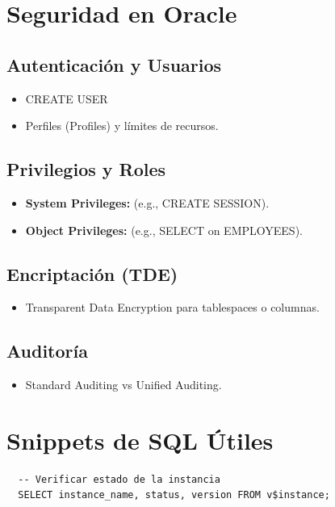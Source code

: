 \documentclass[11pt]{article}
\begin{document}
\section{Seguridad en Oracle}
\label{sec:orgdd45089}
\subsection{Autenticación y Usuarios}
\label{sec:orgaed1488}
\begin{itemize}
\item CREATE USER
\item Perfiles (Profiles) y límites de recursos.
\end{itemize}
\subsection{Privilegios y Roles}
\label{sec:orgdf0d904}
\begin{itemize}
\item \textbf{System Privileges:} (e.g., CREATE SESSION).
\item \textbf{Object Privileges:} (e.g., SELECT on EMPLOYEES).
\end{itemize}
\subsection{Encriptación (TDE)}
\label{sec:org36f106d}
\begin{itemize}
\item Transparent Data Encryption para tablespaces o columnas.
\end{itemize}
\subsection{Auditoría}
\label{sec:org42d23c1}
\begin{itemize}
\item Standard Auditing vs Unified Auditing.
\end{itemize}
\section{Snippets de SQL Útiles}
\label{sec:org5b2d61a}
\begin{verbatim}
  -- Verificar estado de la instancia
  SELECT instance_name, status, version FROM v$instance;
\end{verbatim}
\end{document}
